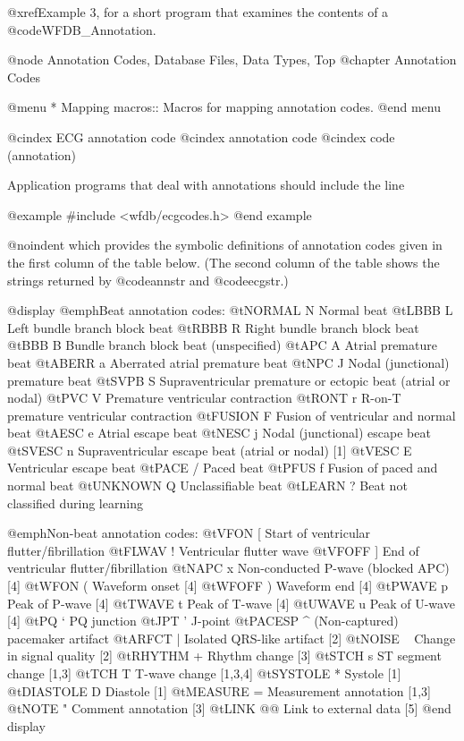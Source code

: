 {{{{{{{{{{@xref{Example 3}, for a short program that examines the contents of a
@code{WFDB_Annotation}.

@node     Annotation Codes, Database Files, Data Types, Top
@chapter Annotation Codes

@menu
* Mapping macros::		Macros for mapping annotation codes.
@end menu

@cindex ECG annotation code
@cindex annotation code
@cindex code (annotation)

Application programs that deal with annotations should include the
line

@example
#include <wfdb/ecgcodes.h>
@end example

@noindent
which provides the symbolic definitions of annotation codes given in the
first column of the table below.  (The second column of the table shows
the strings returned by @code{annstr} and @code{ecgstr}.)

@display
@emph{Beat annotation codes:}
@t{NORMAL   N  } Normal beat
@t{LBBB     L  } Left bundle branch block beat
@t{RBBB     R  } Right bundle branch block beat
@t{BBB      B  } Bundle branch block beat (unspecified)
@t{APC      A  } Atrial premature beat
@t{ABERR    a  } Aberrated atrial premature beat
@t{NPC      J  } Nodal (junctional) premature beat
@t{SVPB     S  } Supraventricular premature or ectopic beat (atrial or nodal)
@t{PVC      V  } Premature ventricular contraction
@t{RONT     r  } R-on-T premature ventricular contraction
@t{FUSION   F  } Fusion of ventricular and normal beat
@t{AESC     e  } Atrial escape beat
@t{NESC     j  } Nodal (junctional) escape beat
@t{SVESC    n  } Supraventricular escape beat (atrial or nodal) [1]
@t{VESC     E  } Ventricular escape beat
@t{PACE     /  } Paced beat
@t{PFUS     f  } Fusion of paced and normal beat
@t{UNKNOWN  Q  } Unclassifiable beat
@t{LEARN    ?  } Beat not classified during learning

@emph{Non-beat annotation codes:}
@t{VFON     [  } Start of ventricular flutter/fibrillation
@t{FLWAV    !  } Ventricular flutter wave
@t{VFOFF    ]  } End of ventricular flutter/fibrillation
@t{NAPC     x  } Non-conducted P-wave (blocked APC) [4]
@t{WFON     (  } Waveform onset [4]
@t{WFOFF    )  } Waveform end [4]
@t{PWAVE    p  } Peak of P-wave [4]
@t{TWAVE    t  } Peak of T-wave [4]
@t{UWAVE    u  } Peak of U-wave [4]
@t{PQ       `  } PQ junction
@t{JPT      '  } J-point
@t{PACESP   ^  } (Non-captured) pacemaker artifact
@t{ARFCT    |  } Isolated QRS-like artifact [2]
@t{NOISE    ~  } Change in signal quality [2]
@t{RHYTHM   +  } Rhythm change [3]
@t{STCH     s  } ST segment change [1,3]
@t{TCH      T  } T-wave change [1,3,4]
@t{SYSTOLE  *  } Systole [1]
@t{DIASTOLE D  } Diastole [1]
@t{MEASURE  =  } Measurement annotation [1,3]
@t{NOTE     "  } Comment annotation [3]
@t{LINK     @@  } Link to external data [5]
@end display

}}}}}}}}}}
